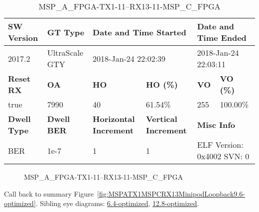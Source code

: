 \begin{table}[h]
\centering
\caption{MSP\_A\_FPGA-TX1-11--RX13-11-MSP\_C\_FPGA}
\label{tab:MSPAFPGATX111RX1311MSPCFPGA9.6-optimized}
\begin{tabular}{@{}|l|l|l|l|l|l|@{}}
\toprule
\textbf{SW Version}                & \textbf{GT Type}   & \multicolumn{2}{l|}{\textbf{Date and Time Started}}            & \multicolumn{2}{l|}{\textbf{Date and Time Ended}}        \\ \midrule
2017.2                       & UltraScale GTY          & \multicolumn{2}{l|}{2018-Jan-24 22:02:39}                   & \multicolumn{2}{l|}{2018-Jan-24 22:03:11}               \\ \midrule
\textbf{Reset RX}                  & \textbf{OA} & \textbf{HO}   & \textbf{HO (\%)} & \textbf{VO} & \textbf{VO (\%)} \\ \midrule
true & 7990        & 40          & 61.54\%        & 255        & 100.00\%       \\ \midrule
\textbf{Dwell Type}                & \textbf{Dwell BER} & \textbf{Horizontal Increment} & \textbf{Vertical Increment}    & \multicolumn{2}{l|}{\textbf{Misc Info}}                  \\ \midrule
BER                            & 1e-7        & 1        & 1           & \multicolumn{2}{l|}{ELF Version: 0x4002 SVN: 0}                         \\ \bottomrule
\end{tabular}
\end{table}

\begin{figure}[h]
\caption{MSP\_A\_FPGA-TX1-11--RX13-11-MSP\_C\_FPGA} \label{fig:MSPAFPGATX111RX1311MSPCFPGA9.6-optimized}
\end{figure}

Call back to summary Figure~\ref{fig:MSPATX1MSPCRX13MinipodLoopback9.6-optimized}.
Sibling eye diagrams: \hyperref[sec:MSPAFPGATX111RX1311MSPCFPGA6.4-optimized]{6.4-optimized}, \hyperref[sec:MSPAFPGATX111RX1311MSPCFPGA12.8-optimized]{12.8-optimized}.

\clearpage
\newpage

